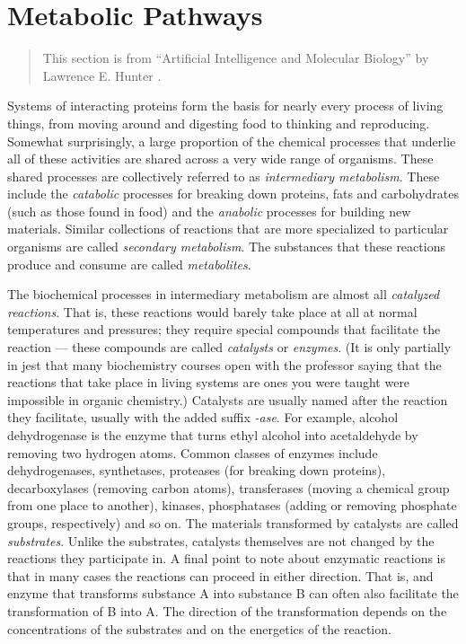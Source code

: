 \section{Metabolic Pathways}
\label{sect:metabolic_pathways}

\begin{quote}
    This section is from ``Artificial Intelligence and Molecular Biology'' by
    Lawrence E. Hunter \cite{mb-for-cs}.
\end{quote}

Systems of interacting proteins form the basis for nearly every process of
living things, from moving around and digesting food to thinking and
reproducing. Somewhat surprisingly, a large proportion of the chemical processes
that underlie all of these activities are shared across a very wide range of
organisms. These shared processes are collectively referred to as
\emph{intermediary metabolism}. These include the \emph{catabolic} processes for
breaking down proteins, fats and carbohydrates (such as those found in food) and
the \emph{anabolic} processes for building new materials. Similar collections of
reactions that are more specialized to particular organisms are called
\emph{secondary metabolism}. The substances that these reactions produce and
consume are called \emph{metabolites}.

The biochemical processes in intermediary metabolism are almost all
\emph{catalyzed reactions}. That is, these reactions would barely take place at
all at normal temperatures and pressures; they require special compounds that
facilitate the reaction --- these compounds are called \emph{catalysts} or
\emph{enzymes}. (It is only partially in jest that many biochemistry courses
open with the professor saying that the reactions that take place in living
systems are ones you were taught were impossible in organic chemistry.)
Catalysts are usually named after the reaction they facilitate, usually with the
added suffix \emph{-ase}. For example, alcohol dehydrogenase is the enzyme that
turns ethyl alcohol into acetaldehyde by removing two hydrogen atoms. Common
classes of enzymes include dehydrogenases, synthetases, proteases (for breaking
down proteins), decarboxylases (removing carbon atoms), transferases (moving a
chemical group from one place to another), kinases, phosphatases (adding or
removing phosphate groups, respectively) and so on. The materials transformed by
catalysts are called \emph{substrates}. Unlike the substrates, catalysts
themselves are not changed by the reactions they participate in. A final point
to note about enzymatic reactions is that in many cases the reactions can
proceed in either direction. That is, and enzyme that transforms substance A
into substance B can often also facilitate the transformation of B into A. The
direction of the transformation depends on the concentrations of the substrates
and on the energetics of the reaction.

